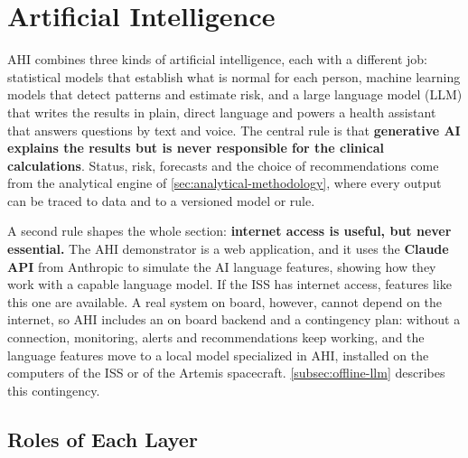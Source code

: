 \section{Artificial Intelligence}
\label{sec:artificial-intelligence}

AHI combines three kinds of artificial intelligence, each with a different job: statistical models that establish what is normal for each person, machine learning models that detect patterns and estimate risk, and a large language model (LLM) that writes the results in plain, direct language and powers a health assistant that answers questions by text and voice. The central rule is that \textbf{generative AI explains the results but is never responsible for the clinical calculations}. Status, risk, forecasts and the choice of recommendations come from the analytical engine of \ref{sec:analytical-methodology}, where every output can be traced to data and to a versioned model or rule.

A second rule shapes the whole section: \textbf{internet access is useful, but never essential.} The AHI demonstrator is a web application, and it uses the \textbf{Claude API} from Anthropic \cite{anthropic_claude_api} to simulate the AI language features, showing how they work with a capable language model. If the ISS has internet access, features like this one are available. A real system on board, however, cannot depend on the internet, so AHI includes an on board backend and a contingency plan: without a connection, monitoring, alerts and recommendations keep working, and the language features move to a local model specialized in AHI, installed on the computers of the ISS or of the Artemis spacecraft. \ref{subsec:offline-llm} describes this contingency.

\subsection{Roles of Each Layer}
\label{subsec:ai-roles}

